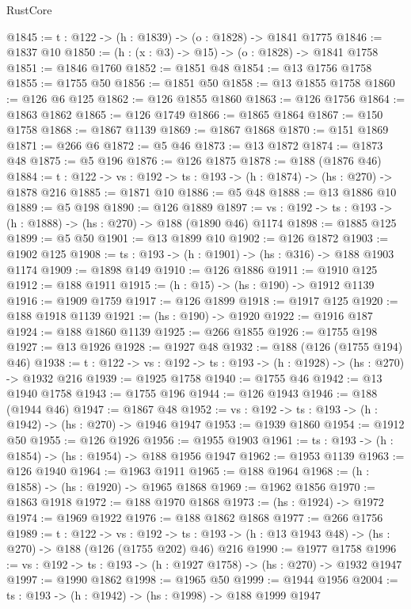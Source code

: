 \begin{lexlean}{RustCore}
\begin{coremodule}
@1845 := {t : @122} -> (h : @1839) -> (o : @1828) -> @1841 @1775
@1846 := @1837 @10
@1850 := (h : (x : @3) -> @15) -> (o : @1828) -> @1841 @1758
@1851 := @1846 @1760
@1852 := @1851 @48
@1854 := @13 @1756 @1758
@1855 := @1755 @50
@1856 := @1851 @50
@1858 := @13 @1855 @1758
@1860 := @126 @6 @125
@1862 := @126 @1855 @1860
@1863 := @126 @1756
@1864 := @1863 @1862
@1865 := @126 @1749
@1866 := @1865 @1864
@1867 := @150 @1758
@1868 := @1867 @1139
@1869 := @1867 @1868
@1870 := @151 @1869
@1871 := @266 @6
@1872 := @5 @46
@1873 := @13 @1872
@1874 := @1873 @48
@1875 := @5 @196
@1876 := @126 @1875
@1878 := @188 (@1876 @46)
@1884 := {t : @122} -> {vs : @192} -> {ts : @193} -> (h : @1874) -> (hs : @270) -> @1878 @216
@1885 := @1871 @10
@1886 := @5 @48
@1888 := @13 @1886 @10
@1889 := @5 @198
@1890 := @126 @1889
@1897 := {vs : @192} -> {ts : @193} -> (h : @1888) -> (hs : @270) -> @188 (@1890 @46) @1174
@1898 := @1885 @125
@1899 := @5 @50
@1901 := @13 @1899 @10
@1902 := @126 @1872
@1903 := @1902 @125
@1908 := {ts : @193} -> (h : @1901) -> (hs : @316) -> @188 @1903 @1174
@1909 := @1898 @149
@1910 := @126 @1886
@1911 := @1910 @125
@1912 := @188 @1911
@1915 := (h : @15) -> (hs : @190) -> @1912 @1139
@1916 := @1909 @1759
@1917 := @126 @1899
@1918 := @1917 @125
@1920 := @188 @1918 @1139
@1921 := (hs : @190) -> @1920
@1922 := @1916 @187
@1924 := @188 @1860 @1139
@1925 := @266 @1855
@1926 := @1755 @198
@1927 := @13 @1926
@1928 := @1927 @48
@1932 := @188 (@126 (@1755 @194) @46)
@1938 := {t : @122} -> {vs : @192} -> {ts : @193} -> (h : @1928) -> (hs : @270) -> @1932 @216
@1939 := @1925 @1758
@1940 := @1755 @46
@1942 := @13 @1940 @1758
@1943 := @1755 @196
@1944 := @126 @1943
@1946 := @188 (@1944 @46)
@1947 := @1867 @48
@1952 := {vs : @192} -> {ts : @193} -> (h : @1942) -> (hs : @270) -> @1946 @1947
@1953 := @1939 @1860
@1954 := @1912 @50
@1955 := @126 @1926
@1956 := @1955 @1903
@1961 := {ts : @193} -> (h : @1854) -> (hs : @1954) -> @188 @1956 @1947
@1962 := @1953 @1139
@1963 := @126 @1940
@1964 := @1963 @1911
@1965 := @188 @1964
@1968 := (h : @1858) -> (hs : @1920) -> @1965 @1868
@1969 := @1962 @1856
@1970 := @1863 @1918
@1972 := @188 @1970 @1868
@1973 := (hs : @1924) -> @1972
@1974 := @1969 @1922
@1976 := @188 @1862 @1868
@1977 := @266 @1756
@1989 := {t : @122} ->
  {vs : @192} ->
  {ts : @193} -> (h : @13 @1943 @48) -> (hs : @270) -> @188 (@126 (@1755 @202) @46) @216
@1990 := @1977 @1758
@1996 := {vs : @192} -> {ts : @193} -> (h : @1927 @1758) -> (hs : @270) -> @1932 @1947
@1997 := @1990 @1862
@1998 := @1965 @50
@1999 := @1944 @1956
@2004 := {ts : @193} -> (h : @1942) -> (hs : @1998) -> @188 @1999 @1947

\end{coremodule}
\end{lexlean}
